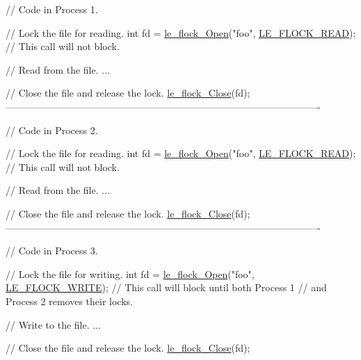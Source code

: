 \begin{DoxyCode}
     \textcolor{comment}{// Code in Process 1.}

     \textcolor{comment}{// Lock the file for reading.}
     \textcolor{keywordtype}{int} fd = \hyperlink{le__file_lock_8h_aac3e11a6f7f363d29b8dbb1eb6c2c287}{le\_flock\_Open}(\textcolor{stringliteral}{"foo"}, \hyperlink{le__file_lock_8h_a5e5400e33a5e10b7c624748a9ce11280a887421ec0def966e3ffc65e6bde1f1fc}{LE\_FLOCK\_READ});  \textcolor{comment}{// This call will not block.}

     \textcolor{comment}{// Read from the file.}
     ...

     \textcolor{comment}{// Close the file and release the lock.}
     \hyperlink{le__file_lock_8h_a457a07dbf8967757322f531d5beb10b6}{le\_flock\_Close}(fd);
-------------------------------------------------------------------------------------------------

     \textcolor{comment}{// Code in Process 2.}

     \textcolor{comment}{// Lock the file for reading.}
     \textcolor{keywordtype}{int} fd = \hyperlink{le__file_lock_8h_aac3e11a6f7f363d29b8dbb1eb6c2c287}{le\_flock\_Open}(\textcolor{stringliteral}{"foo"}, \hyperlink{le__file_lock_8h_a5e5400e33a5e10b7c624748a9ce11280a887421ec0def966e3ffc65e6bde1f1fc}{LE\_FLOCK\_READ});  \textcolor{comment}{// This call will not block.}

     \textcolor{comment}{// Read from the file.}
     ...

     \textcolor{comment}{// Close the file and release the lock.}
     \hyperlink{le__file_lock_8h_a457a07dbf8967757322f531d5beb10b6}{le\_flock\_Close}(fd);
-------------------------------------------------------------------------------------------------

     \textcolor{comment}{// Code in Process 3.}

     \textcolor{comment}{// Lock the file for writing.}
     \textcolor{keywordtype}{int} fd = \hyperlink{le__file_lock_8h_aac3e11a6f7f363d29b8dbb1eb6c2c287}{le\_flock\_Open}(\textcolor{stringliteral}{"foo"}, \hyperlink{le__file_lock_8h_a5e5400e33a5e10b7c624748a9ce11280a058867728a1de4773023f009c2934188}{LE\_FLOCK\_WRITE});  \textcolor{comment}{// This call will block
       until both Process 1}
                                                     \textcolor{comment}{// and Process 2 removes their locks.}

     \textcolor{comment}{// Write to the file.}
     ...

     \textcolor{comment}{// Close the file and release the lock.}
     \hyperlink{le__file_lock_8h_a457a07dbf8967757322f531d5beb10b6}{le\_flock\_Close}(fd);
\end{DoxyCode}


